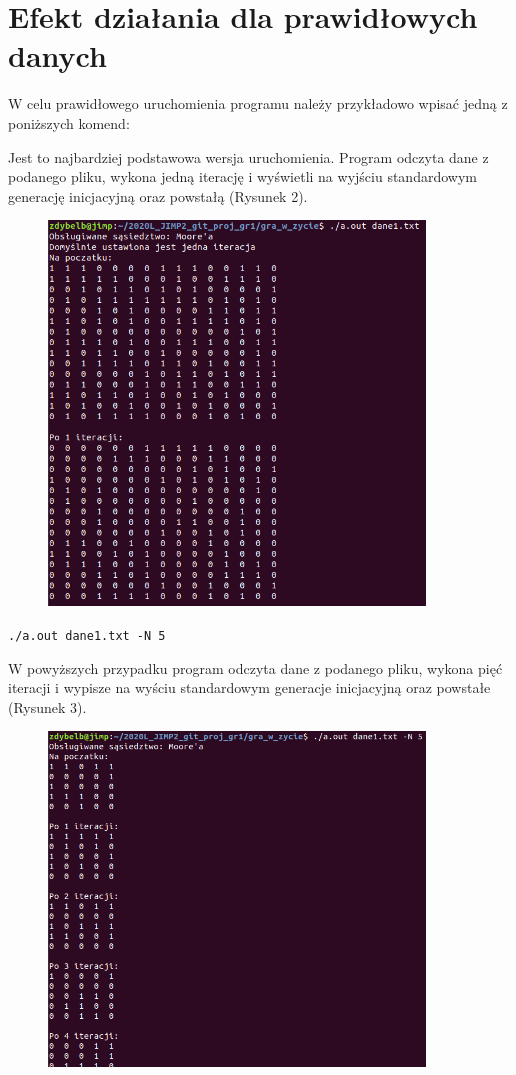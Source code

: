 \documentclass{article}
\begin{document}
\section{Efekt działania dla prawidłowych danych}
{\fontsize{14}{14}\selectfont

W celu prawidłowego uruchomienia programu należy przykładowo wpisać jedną z poniższych komend:



Jest to najbardziej podstawowa wersja uruchomienia. Program odczyta dane z podanego pliku, wykona jedną iterację i wyświetli na wyjściu standardowym generację inicjacyjną oraz powstałą (Rysunek 2).

\begin{figure}[h]
\centering
\includegraphics[width=10cm]{podstawowe.png}
\caption{}
\label{fig:podstawowe.png}
\end{figure}




\texttt{./a.out dane1.txt -N 5} 

W powyższych przypadku program odczyta dane z podanego pliku, wykona pięć iteracji i wypisze na wyściu standardowym generacje inicjacyjną oraz powstałe (Rysunek 3).


\begin{figure}[h]
\centering
\includegraphics[width=10cm]{N.png}
\caption{}
\label{fig:N.png}
\end{figure}

}
\end{document}
